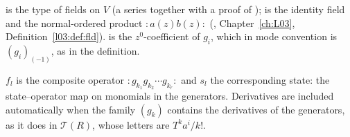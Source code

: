 \begin{dictionary}
 is the type of fields on $V$ (a series together with a proof of );  is the identity
field and  the normal-ordered product ${:}a(z)b(z){:}$ (,
Chapter~\ref{ch:L03}, Definition~\ref{l03:def:fld}).  is the $z^0$-coefficient of $g_i$, which in mode convention is
$(g_i)_{(-1)}$, as in the definition.
\end{dictionary}

\begin{physics}
$f_l$ is the composite operator ${:}g_{k_1}g_{k_2}\cdots g_{k_r}{:}$ and $s_l$ the corresponding state: the state--operator map
on monomials in the generators. Derivatives are included automatically when the family $(g_k)$ contains the derivatives of the
generators, as it does in $\mathcal T(R)$, whose letters are $T^ka^i/k!$.
\end{physics}

